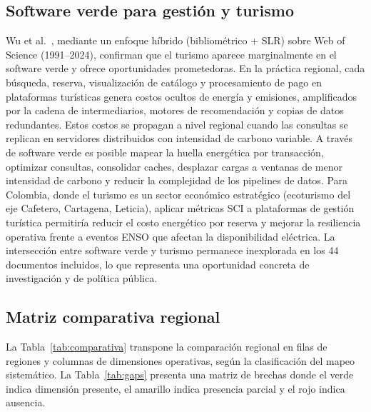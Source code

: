 \documentclass[conference]{IEEEtran}
\begin{document}
\subsection{Software verde para gesti\'on y turismo}\label{sec:gestionturismo}
Wu et al.~\cite{wu2025}, mediante un enfoque h\'ibrido (bibliom\'etrico + SLR) sobre Web of Science (1991--2024), confirman que el turismo aparece marginalmente en el software verde y ofrece oportunidades prometedoras. En la pr\'actica regional, cada b\'usqueda, reserva, visualizaci\'on de cat\'alogo y procesamiento de pago en plataformas tur\'isticas genera costos ocultos de energ\'ia y emisiones, amplificados por la cadena de intermediarios, motores de recomendaci\'on y copias de datos redundantes. Estos costos se propagan a nivel regional cuando las consultas se replican en servidores distribuidos con intensidad de carbono variable. A trav\'es de software verde es posible mapear la huella energ\'etica por transacci\'on, optimizar consultas, consolidar caches, desplazar cargas a ventanas de menor intensidad de carbono y reducir la complejidad de los pipelines de datos. Para Colombia, donde el turismo es un sector econ\'omico estrat\'egico (ecoturismo del eje Cafetero, Cartagena, Leticia), aplicar m\'etricas SCI a plataformas de gesti\'on tur\'istica permitir\'ia reducir el costo energ\'etico por reserva y mejorar la resiliencia operativa frente a eventos ENSO que afectan la disponibilidad el\'ectrica. La intersecci\'on entre software verde y turismo permanece inexplorada en los 44 documentos incluidos, lo que representa una oportunidad concreta de investigaci\'on y de pol\'itica p\'ublica.

\subsection{Matriz comparativa regional}
La Tabla~\ref{tab:comparativa} transpone la comparaci\'on regional en filas de regiones y columnas de dimensiones operativas, seg\'un la clasificaci\'on del mapeo sistem\'atico. La Tabla~\ref{tab:gaps} presenta una matriz de brechas donde el verde indica dimensi\'on presente, el amarillo indica presencia parcial y el rojo indica ausencia.
\end{document}
